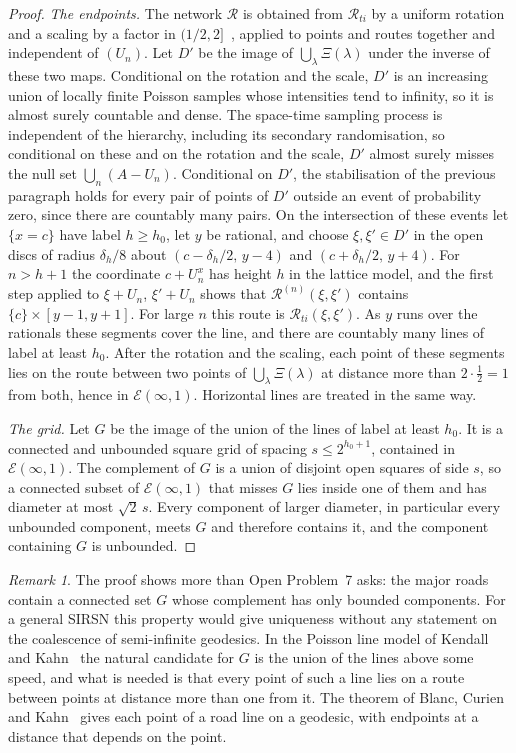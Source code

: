 \documentclass[11pt]{amsart}
\theoremstyle{remark}
\newtheorem{remark}[theorem]{Remark}
\begin{document}
\begin{proof}
\emph{The endpoints.} The network $\mathcal R$ is obtained from $\mathcal R_{ti}$ by a uniform rotation and a scaling
by a factor in $(1/2,2]$~\cite[Section~3.7]{A14}, applied to points and routes together and independent of $(U_n)$.
Let $D'$ be the image of $\bigcup_\lambda\Xi(\lambda)$ under the inverse of these two maps. Conditional on the
rotation and the scale, $D'$ is an increasing union of locally finite Poisson samples whose intensities tend to
infinity, so it is almost surely countable and dense. The space-time sampling process is independent of the hierarchy,
including its secondary randomisation, so conditional on these and on the rotation and the scale, $D'$ almost surely
misses the null set $\bigcup_n(A-U_n)$. Conditional on $D'$, the stabilisation of the previous paragraph
holds for every pair of points of $D'$ outside an event of probability zero, since there are countably many pairs.
On the intersection of these events let $\{x=c\}$ have label $h\ge h_0$, let $y$ be rational, and choose
$\xi,\xi'\in D'$ in the open discs of radius $\delta_h/8$ about $(c-\delta_h/2,\,y-4)$ and $(c+\delta_h/2,\,y+4)$.
For $n>h+1$ the coordinate $c+U^x_n$ has height $h$ in the lattice model, and the first step applied to
$\xi+U_n$, $\xi'+U_n$ shows that $\mathcal R^{(n)}(\xi,\xi')$ contains $\{c\}\times[y-1,y+1]$. For large $n$ this
route is $\mathcal R_{ti}(\xi,\xi')$. As $y$ runs over the rationals these segments cover the line, and there are
countably many lines of label at least $h_0$. After the rotation and the scaling, each point of these segments lies on
the route between two points of $\bigcup_\lambda\Xi(\lambda)$ at distance more than $2\cdot\frac12=1$ from both, hence
in $\mathcal E(\infty,1)$. Horizontal lines are treated in the same way.

\emph{The grid.} Let $G$ be the image of the union of the lines of label at least $h_0$. It is a connected and
unbounded square grid of spacing $s\le2^{h_0+1}$, contained in $\mathcal E(\infty,1)$. The complement of $G$ is a union
of disjoint open squares of side $s$, so a connected subset of $\mathcal E(\infty,1)$ that misses $G$ lies inside one
of them and has diameter at most $\sqrt2\,s$. Every component of larger diameter, in particular every unbounded
component, meets $G$ and therefore contains it, and the component containing $G$ is unbounded.
\end{proof}

\begin{remark}
The proof shows more than Open Problem~7 asks: the major roads contain a connected set $G$ whose complement has only
bounded components. For a general SIRSN this property would give uniqueness without any statement on the coalescence
of semi-infinite geodesics. In the Poisson line model of Kendall~\cite{K17} and Kahn~\cite{Kahn16} the natural
candidate for $G$ is the union of the lines above some speed, and what is needed is that every point of such a line
lies on a route between points at distance more than one from it. The theorem of Blanc, Curien and
Kahn~\cite{BCK25} gives each point of a road line on a geodesic, with endpoints at a distance that depends on the point.
\end{remark}
\end{document}
